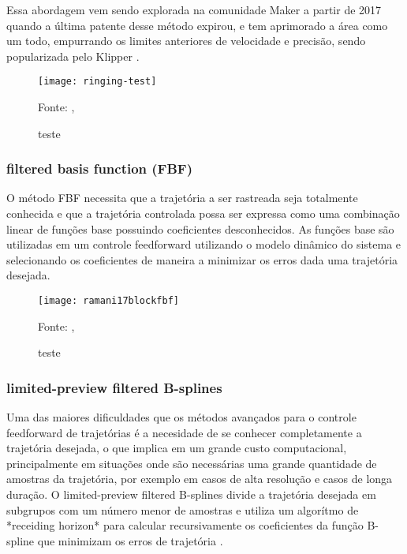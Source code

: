 Essa abordagem vem sendo explorada na comunidade Maker a partir de 2017 
quando a última patente desse método expirou, e tem aprimorado a área como
um todo, empurrando os limites anteriores de velocidade e precisão,
sendo popularizada pelo Klipper \cite{klipperkinematic}.


\begin{figure}[!htb]
    \centering
    \caption{teste}
    \texttt{[image: ringing-test]}

    {\footnotesize Fonte: \citeauthor{klipperkinematic}, \citeyear{klipperkinematic}}
    \label{fig:label4}
\end{figure}

\subsubsection{filtered basis function (FBF)}
O método FBF necessita que a trajetória a ser rastreada seja totalmente
conhecida e que a trajetória controlada possa ser expressa como
uma combinação linear de funções base possuindo coeficientes desconhecidos.
As funções base são utilizadas em um controle feedforward utilizando
o modelo dinâmico do sistema e selecionando os coeficientes de maneira a
minimizar os erros dada uma trajetória desejada.
\cite{ramani17}

\begin{figure}[!htb]
    \centering
    \caption{teste}
    \texttt{[image: ramani17blockfbf]}

    {\footnotesize Fonte: \citeauthor{ramani17}, \citeyear{ramani17}}
    \label{fig:label7}
\end{figure}

\subsubsection{limited-preview filtered B-splines}
Uma das maiores dificuldades que os métodos avançados para o
controle feedforward de trajetórias é a necesidade de se conhecer
completamente a trajetória desejada, o que implica em um grande custo
computacional, principalmente em situações onde são necessárias uma
grande quantidade de amostras da trajetória, por exemplo em casos de alta resolução
e casos de longa duração.
O limited-preview filtered B-splines divide a trajetória desejada em subgrupos
com um número menor de amostras e utiliza um algorítmo de *receiding horizon* para
calcular recursivamente os coeficientes da função B-spline que minimizam os erros
de trajetória \cite{duan18}.

